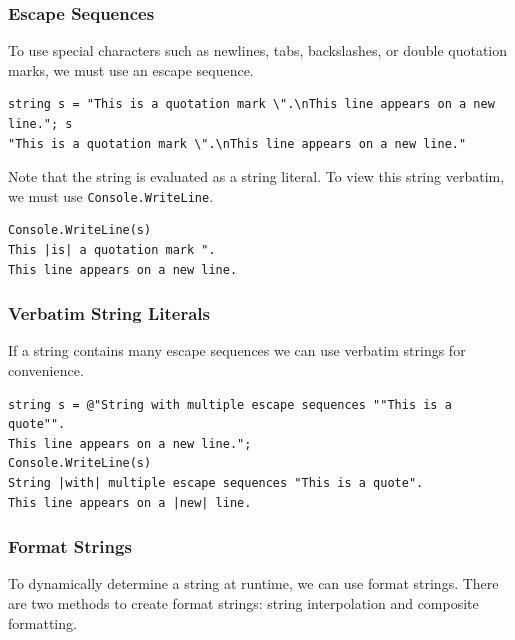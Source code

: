\documentclass{article}
\def\customlinemarker#1#2{
    \edef\thelstnumber{%
        \unexpanded{%
            \ifnum#1=\value{lstnumber}\relax
              #2%
            \fi}%
        \ifx\thelstnumber\relax\else
        \expandafter\unexpanded\expandafter{\thelstnumber}%
        \fi
    }
}
\begin{document}
\subsubsection{Escape Sequences}
To use special characters such as newlines, tabs, backslashes, or double quotation marks, we must
use an escape sequence.
\begingroup
\let\thelstnumber\relax
\customlinemarker{1}{\$}
\begin{lstlisting}
string s = "This is a quotation mark \".\nThis line appears on a new line."; s
"This is a quotation mark \".\nThis line appears on a new line."
\end{lstlisting}
\endgroup
Note that the string is evaluated as a string literal. To view this string verbatim, we must use
\lstinline{Console.WriteLine}.
\begingroup
\let\thelstnumber\relax
\customlinemarker{1}{\$}
\begin{lstlisting}[escapeinside=||]
Console.WriteLine(s) 
This |is| a quotation mark ".
This line appears on a new line.
\end{lstlisting}
\endgroup
\subsubsection{Verbatim String Literals}
If a string contains many escape sequences we can use verbatim strings for convenience.
\begingroup
\let\thelstnumber\relax
\customlinemarker{1}{\$}
\customlinemarker{3}{\$}
\begin{lstlisting}[escapeinside=||]
string s = @"String with multiple escape sequences ""This is a quote"".
This line appears on a new line.";
Console.WriteLine(s)
String |with| multiple escape sequences "This is a quote".
This line appears on a |new| line.
\end{lstlisting}
\endgroup
\subsubsection{Format Strings}
To dynamically determine a string at runtime, we can use format strings.
There are two methods to create format strings: string interpolation and composite formatting.
\end{document}
